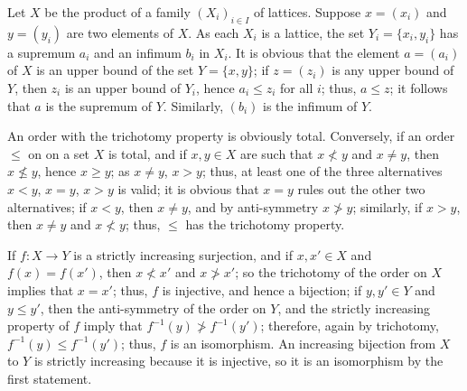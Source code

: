 \documentclass{article}
\begin{document}
\begin{solution}[\ref{exe:yowl3axc}]
  \label{sol:rfwhck5v}
  Let \(X\) be the product of a family \((X_i)_{i \in I}\) of
  lattices.  Suppose \(x = (x_i)\) and \(y = (y_i)\) are two elements
  of \(X\).  As each \(X_i\) is a lattice, the set
  \(Y_i = \{ x_i, y_i \}\) has a supremum \(a_i\) and an infimum
  \(b_i\) in \(X_i\).  It is obvious that the element \(a = (a_i)\) of
  \(X\) is an upper bound of the set \(Y = \{ x, y \}\); if
  \(z = (z_i)\) is any upper bound of \(Y\), then \(z_i\) is an upper
  bound of \(Y_i\), hence \(a_i \leq z_i\) for all \(i\); thus,
  \(a \leq z\); it follows that \(a\) is the supremum of \(Y\).
  Similarly, \((b_i)\) is the infimum of \(Y\).
\end{solution}

\begin{solution}[\ref{exe:4knqif5b}]
  \label{sol:ien6orgc}
  An order with the trichotomy property is obviously total.
  Conversely, if an order \(\leq\) on on a set \(X\) is total, and if
  \(x,y \in X\) are such that \(x \nless y\) and \(x \neq y\), then
  \(x \nleq y\), hence \(x \geq y\); as \(x \neq y\), \(x > y\); thus,
  at least one of the three alternatives \(x < y\), \(x = y\),
  \(x > y\) is valid; it is obvious that \(x = y\) rules out the other
  two alternatives; if \(x < y\), then \(x \neq y\), and by
  anti-symmetry \(x \ngtr y\); similarly, if \(x > y\), then
  \(x \neq y\) and \(x \nless y\); thus, \(\leq\) has the trichotomy
  property.
\end{solution}

\begin{solution}[\ref{exe:v1tw1ijd}]
  \label{sol:rd6deawb}
  If \(f : X \to Y\) is a strictly increasing surjection, and if
  \(x, x' \in X\) and \(f(x) = f(x')\), then \(x \nless x'\) and
  \(x \ngtr x'\); so the trichotomy of the order on \(X\) implies that
  \(x = x'\); thus, \(f\) is injective, and hence a bijection; if
  \(y, y' \in Y\) and \(y \leq y'\), then the anti-symmetry of the
  order on \(Y\), and the strictly increasing property of \(f\) imply
  that \(f^{-1}(y) \ngtr f^{-1}(y')\); therefore, again by trichotomy,
  \(f^{-1}(y) \leq f^{-1}(y')\); thus, \(f\) is an isomorphism.  An
  increasing bijection from \(X\) to \(Y\) is strictly increasing
  because it is injective, so it is an isomorphism by the first
  statement.
\end{solution}
\end{document}
